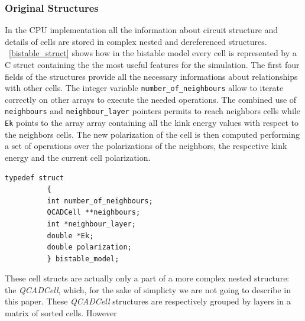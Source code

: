\subsubsection{Original Structures}
In the CPU implementation all the information about circuit structure and details of cells are stored in complex nested and dereferenced
 structures. \lstlistingname~\ref{bistable_struct} shows how in the bistable model every cell is represented by a C struct containing 
the the most useful features for the simulation.
The first four fields of the structures provide all the necessary informations about relationships with other cells. The integer variable 
\texttt{number\_of\_neighbours} allow to iterate correctly on other arrays to execute the needed operations.
The combined use of \texttt{neighbours} and \texttt{neighbour\_layer} pointers permits to reach neighbors cells while \texttt{Ek} points
to the array array containing all the kink energy values with respect to the neighbors cells.\newline
The new polarization of the cell is then computed performing a set of operations over the polarizations of the neighbors, the respective 
kink energy and the current cell polarization.\newline
\begin{lstlisting}[caption=Bistable model structure for the cell, label=bistable_struct]
	    typedef struct
	      {
	      int number_of_neighbours;
	      QCADCell **neighbours;
	      int *neighbour_layer;
	      double *Ek;
	      double polarization;
	      } bistable_model;
\end{lstlisting}
These cell structs are actually only a part of a more complex nested structure: the \textit{QCADCell}, which, for the sake of simplicty 
we are not going to describe in this paper. These \textit{QCADCell} structures are respectively grouped by layers in a matrix of sorted 
cells. However 

